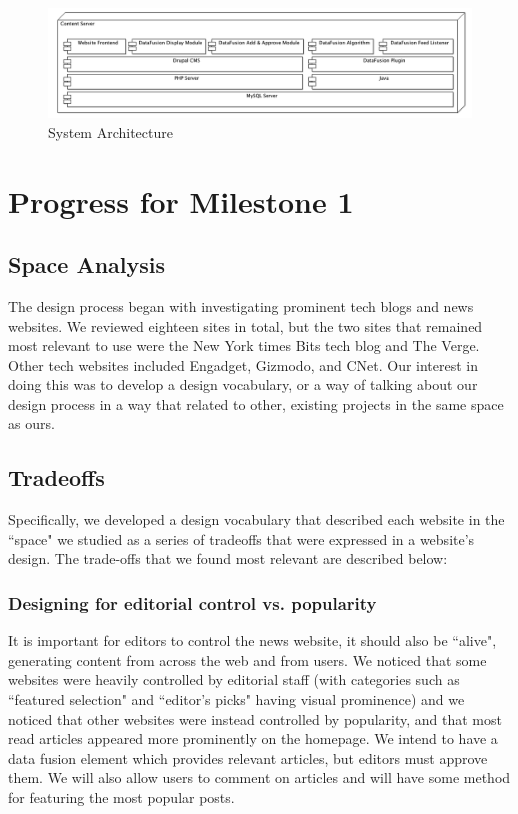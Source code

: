 \documentclass[12pt]{article} %
\begin{document}
\begin{figure}[htbp]
\begin{center}
\includegraphics[width=6in]{images/software_stack}
\caption{System Architecture}
\end{center}
\end{figure}

\section{Progress for Milestone 1}

\subsection{Space Analysis}

The design process began with investigating prominent tech blogs and news websites. We reviewed eighteen sites in total, but the two sites that remained most relevant to use were the New York times Bits tech blog and The Verge. Other tech websites included Engadget, Gizmodo, and CNet. Our interest in doing this was to develop a design vocabulary, or a way of talking about our design process in a way that related to other, existing projects in the same space as ours.

\subsection{Tradeoffs}

Specifically, we developed a design vocabulary that described each website in the ``space" we studied as a series of tradeoffs that were expressed in a website’s design. The trade-offs that we found most relevant are described below:
                   
\subsubsection{Designing for editorial control vs. popularity}
It is important for editors to control the news website, it should also be ``alive", generating content from across the web and from users. We noticed that some websites were heavily controlled by editorial staff (with categories such as ``featured selection" and ``editor’s picks" having visual prominence) and we noticed that other websites were instead controlled by popularity, and that most read articles appeared more prominently on the homepage. We intend to have a data fusion element which provides relevant articles, but editors must approve them. We will also allow users to comment on articles and will have some method for featuring the most popular posts.
\end{document}
